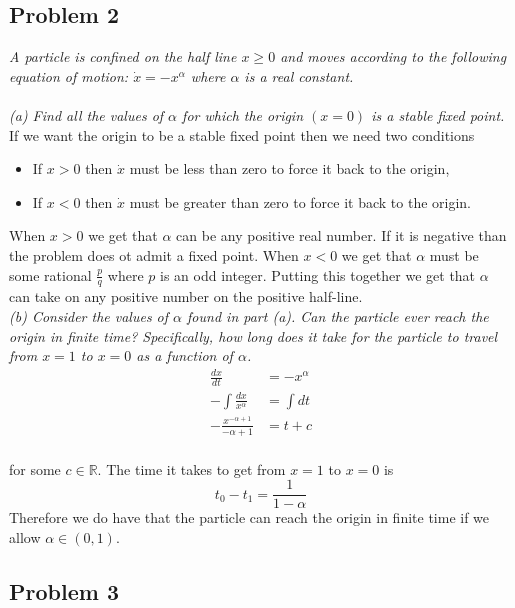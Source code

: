 \documentclass[12pt]{article}
\theoremstyle{remark}
\begin{document}
\newpage

\subsection*{Problem 2}

\textit{A particle is confined on the half line $x \geq 0$ and moves according to the following equation of motion: $\dot{x} = -x^\alpha$ where $\alpha$ is a real constant.} \\ \\
\textit{(a) Find all the values of $\alpha$ for which the origin $(x = 0)$ is a stable fixed point.} \\

If we want the origin to be a stable fixed point then we need two conditions
\begin{itemize}
	\item If $x > 0$ then $\dot{x}$ must be less than zero to force it back to the origin,
	\item If $x < 0$ then $\dot{x}$ must be greater than zero to force  it back to the origin.
\end{itemize}
When $x > 0$ we get that $\alpha$ can be any positive real number. If it is negative than the problem does ot admit a fixed point. When $x < 0$ we get that $\alpha$ must be some rational $\frac{p}{q}$ where $p$ is an odd integer. Putting this together we get that $\alpha$ can take on any positive number on the positive half-line. \\


\textit{(b) Consider the values of $\alpha$ found in part (a). Can the particle ever reach the origin in finite time? Specifically, how long does it take for the particle to travel from $x = 1$ to $x = 0$ as a function of $\alpha$.} \\

\begin{align*}
	\frac{dx}{dt} & = -x^\alpha \\
	-\int\frac{dx}{x^{\alpha}} & = \int dt \\
	-\frac{x^{-\alpha+1}}{-\alpha+1} & = t + c\\
\end{align*}

for some $c \in \mathbb{R}$. The time it takes to get from $x=1$ to $x=0$ is
$$ t_0 - t_1 = \frac{1}{1 - \alpha} $$
Therefore we do have that the particle can reach the origin in finite time if we allow $\alpha \in (0,1)$.
\newpage 

\subsection*{Problem 3}
\end{document}
